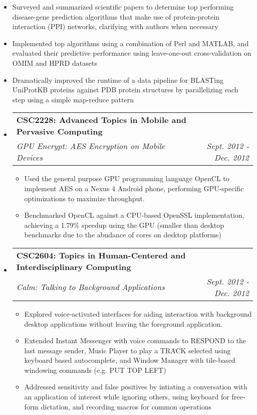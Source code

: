 \documentclass[letterpaper,11pt]{article}
\makeatletter
\newcommand{\resitem}[1]{\item #1 \vspace{-2pt}}
\newcommand{\resheading}[1]{{\large \parashade[.95]{roundcorners}{\textbf{#1 \vphantom{p\^{E}}}}}}
\newcommand{\ressubheading}[4]{
\begin{tabular*}{6.5in}{l@{\extracolsep{\fill}}r}
		\textbf{#1} & #2 \\
		\textit{#3} & \textit{#4} \\
\end{tabular*}\vspace{-6pt}}
\makeatother
\begin{document}
\begin{itemize}
\begin{itemize}
		\resitem{
             Surveyed and summarized scientific papers to determine top performing 
             disease-gene prediction algorithms that make use of protein-protein interaction 
             (PPI) networks, clarifying with authors when necessary
        }
        \resitem{
             Implemented top algorithms using a combination of Perl and MATLAB, and 
             evaluated their predictive performance using leave-one-out cross-validation on 
             OMIM and HPRD datasets
        }
        \resitem{
            Dramatically improved the runtime of a data pipeline for BLASTing UniProtKB 
            proteins against PDB protein structures by parallelizing each step using a 
            simple map-reduce pattern
        }
	\end{itemize}

\end{itemize}

\resheading{Course Projects}
\begin{itemize}

\item

	\ressubheading{CSC2228: Advanced Topics in Mobile and Pervasive Computing}{}{GPU Encrypt: AES Encryption on Mobile Devices}{Sept. 2012 - Dec. 2012}
	\begin{itemize}
		\resitem{
            Used the general purpose GPU programming language OpenCL to implement AES on a 
            Nexus 4 Android phone, performing GPU-specific optimizations to maximize 
            throughput.
        }
		\resitem{
            Benchmarked OpenCL against a CPU-based OpenSSL implementation, achieving a 
            1.79\% speedup using the GPU (smaller than desktop benchmarks due to the 
            abudance of cores on desktop platforms)
        }
	\end{itemize}

\item
	\ressubheading{CSC2604: Topics in Human-Centered and Interdisciplinary Computing}{}{Calm: Talking to Background Applications}{Sept. 2012 - Dec. 2012}
	\begin{itemize}
		\resitem{
            Explored voice-activated interfaces for aiding interaction with background 
            desktop applications without leaving the foreground application.
        }
		\resitem{
            Extended Instant Messenger with voice commands to RESPOND to the last message 
            sender, Music Player to play a TRACK selected using keyboard based 
            autocomplete, and Window Manager with tile-based windowing commands (e.g. PUT 
            TOP LEFT)
        }
		\resitem{
            Addressed sensitivity and false positives by intiating a conversation with an 
            application of interest while ignoring others, using keyboard for free-form 
            dictation, and recording macros for common operations
        }
	\end{itemize}

\end{itemize}
\end{document}
